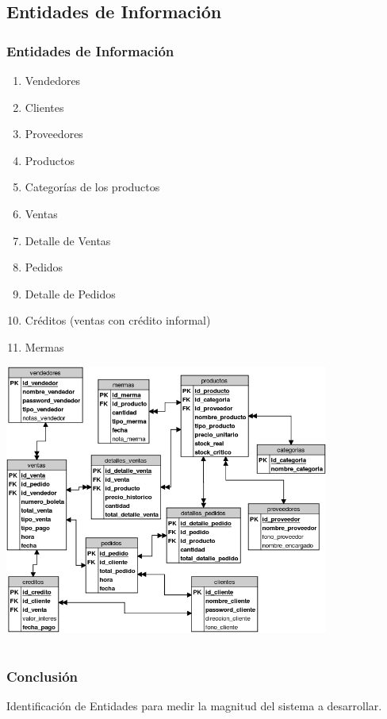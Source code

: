 \documentclass{beamer}
\begin{document}
\subsection{Entidades de Información}

\begin{frame}
\frametitle{Entidades de Información}
\begin{enumerate}
\item Vendedores
\item Clientes
\item Proveedores
\item Productos
\item Categorías de los productos
\item Ventas 
\item Detalle de Ventas
\item Pedidos
\item Detalle de Pedidos 
\item Créditos (ventas con crédito informal)
\item Mermas  
\end{enumerate}
\end{frame}

\begin{frame}
\begin{center}
\includegraphics[width=0.8\textwidth]{images/modelo_relacional.png}
\end{center}
\end{frame}

\section{}

\begin{frame}
\frametitle{Conclusión}
\begin{center}
Identificación de Entidades para medir la magnitud del sistema a desarrollar.
\end{center}
\end{frame}
\end{document}
